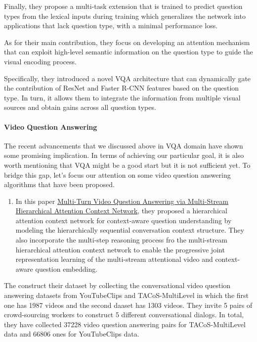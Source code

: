 \documentclass[]{book}
\providecommand{\tightlist}{%
  \setlength{\itemsep}{0pt}\setlength{\parskip}{0pt}}
\let\oldparagraph\paragraph
\renewcommand{\paragraph}[1]{\oldparagraph{#1}\mbox{}}
\theoremstyle{definition}
\theoremstyle{definition}
\theoremstyle{definition}
\theoremstyle{remark}
\begin{document}
Finally, they propose a multi-task extension that is trained to predict
question types from the lexical inputs during training which generalizes
the network into applications that lack question type, with a minimal
performance loss.

As for their main contribution, they focus on developing an attention
mechanism that can exploit high-level semantic information on the
question type to guide the visual encoding process.

Specifically, they introduced a novel VQA architecture that can
dynamically gate the contribution of ResNet and Faster R-CNN features
based on the question type. In turn, it allows them to integrate the
information from multiple visual sources and obtain gains across all
question types.

\paragraph{Video Question Answering}\label{video-question-answering}

The recent advancements that we discussed above in VQA domain have shown
some promising implication. In terms of achieving our particular goal,
it is also worth mentioning that VQA might be a good start but it is not
sufficient yet. To bridge this gap, let's focus our attention on some
video question answering algorithms that have been proposed.

\begin{enumerate}
\def\labelenumi{\arabic{enumi}.}
\tightlist
\item
  In this paper
  \href{https://www.ijcai.org/proceedings/2018/0513.pdf}{Multi-Turn
  Video Question Answering via Multi-Stream Hierarchical Attention
  Context Network}, they proposed a hierarchical attention context
  network for context-aware question understanding by modeling the
  hierarchically sequential conversation context structure. They also
  incorporate the multi-step reasoning process fro the multi-stream
  hierarchical attention context network to enable the progressive joint
  representation learning of the multi-stream attentional video and
  context-aware question embedding.
\end{enumerate}

The construct their dataset by collecting the conversational video
question answering datasets from YouTubeClips and TACoS-MultiLevel in
which the first one has 1987 videos and the second daaset has 1303
videos. They invite 5 pairs of crowd-sourcing workers to construct 5
different conversational dialogs. In total, they have collected 37228
video question answering pairs for TACoS-MultiLevel data and 66806 ones
for YouTubeClips data.
\end{document}
